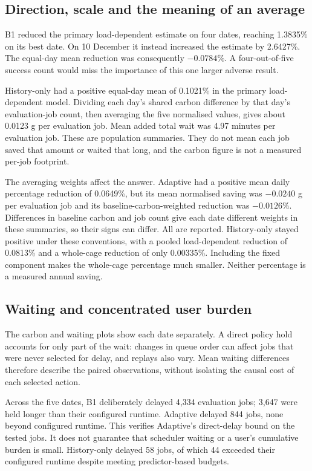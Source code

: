 \subsection{Direction, scale and the meaning of an average}
B1 reduced the primary load-dependent estimate on four dates, reaching 1.3835\% on its best date. On 10 December it instead increased the estimate by 2.6427\%. The equal-day mean reduction was consequently $-0.0784\%$. A four-out-of-five success count would miss the importance of this one larger adverse result.

History-only had a positive equal-day mean of 0.1021\% in the primary load-dependent model. Dividing each day's shared carbon difference by that day's evaluation-job count, then averaging the five normalised values, gives about 0.0123 g \co{} per evaluation job. Mean added total wait was 4.97 minutes per evaluation job. These are population summaries. They do not mean each job saved that amount or waited that long, and the carbon figure is not a measured per-job footprint.

The averaging weights affect the answer. Adaptive had a positive mean daily percentage reduction of 0.0649\%, but its mean normalised saving was $-0.0240$ g per evaluation job and its baseline-carbon-weighted reduction was $-0.0126\%$. Differences in baseline carbon and job count give each date different weights in these summaries, so their signs can differ. All are reported. History-only stayed positive under these conventions, with a pooled load-dependent reduction of 0.0813\% and a whole-cage reduction of only 0.00335\%. Including the fixed component makes the whole-cage percentage much smaller. Neither percentage is a measured annual saving.


\FloatBarrier

\subsection{Waiting and concentrated user burden}\label{sec:user-burden-results}
The carbon and waiting plots show each date separately. A direct policy hold accounts for only part of the wait: changes in queue order can affect jobs that were never selected for delay, and replays also vary. Mean waiting differences therefore describe the paired observations, without isolating the causal cost of each selected action.

Across the five dates, B1 deliberately delayed 4,334 evaluation jobs; 3,647 were held longer than their configured runtime. Adaptive delayed 844 jobs, none beyond configured runtime. This verifies Adaptive's direct-delay bound on the tested jobs. It does not guarantee that scheduler waiting or a user's cumulative burden is small. History-only delayed 58 jobs, of which 44 exceeded their configured runtime despite meeting predictor-based budgets.

